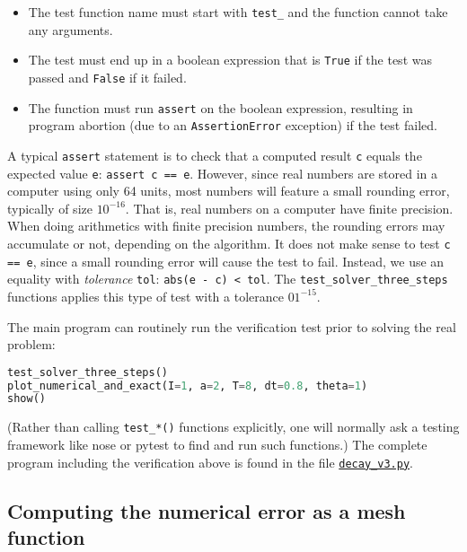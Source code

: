 \documentclass[graybox,sectrefs,envcountresetchap,open=right,final]{svmonodo}
\begin{document}
\begin{itemize}
 \item The test function name must start with \Verb!test_! and the function
   cannot take any arguments.

 \item The test must end up in a boolean expression that is \texttt{True} if
   the test was passed and \texttt{False} if it failed.

 \item The function must run \texttt{assert} on the boolean expression, resulting
   in program abortion (due to an \texttt{AssertionError} exception) if
   the test failed.
\end{itemize}

\noindent
A typical \texttt{assert} statement is to check that a computed result \texttt{c}
equals the expected value \texttt{e}: \texttt{assert c == e}. However, since real
numbers are stored in a computer using only 64 units, most numbers
will feature a small rounding error, typically of size $10^{-16}$.
That is, real numbers on a computer have finite precision. When doing
arithmetics with finite precision numbers, the rounding errors may
accumulate or not, depending on the algorithm.  It does not make sense
to test \texttt{c == e}, since a small rounding error will cause the test to
fail. Instead, we use an equality with \emph{tolerance} \texttt{tol}: \texttt{abs(e - c) < tol}. The \Verb!test_solver_three_steps! functions applies this type of
test with a tolerance $01^{-15}$.

The main program can routinely run the verification test prior to
solving the real problem:

\begin{lstlisting}[language=Python,style=blue1_bluegreen]
test_solver_three_steps()
plot_numerical_and_exact(I=1, a=2, T=8, dt=0.8, theta=1)
show()
\end{lstlisting}
(Rather than calling \Verb!test_*()! functions explicitly, one will
normally ask a testing framework like nose
or pytest to find and run such functions.)
The complete program including the verification above is
found in the file \href{{http://tinyurl.com/ofkw6kc/alg/decay_v3.py}}{\nolinkurl{decay_v3.py}}.


\subsection{Computing the numerical error as a mesh function}
\label{decay:computing:error}
\end{document}
